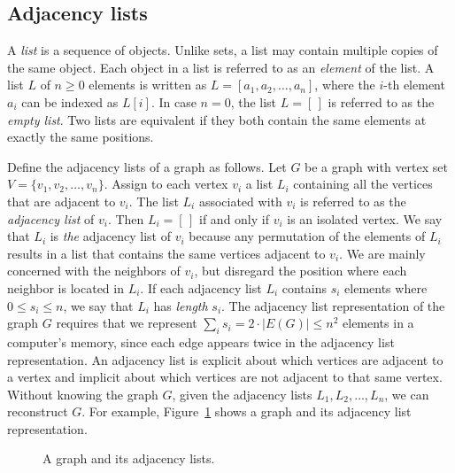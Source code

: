 
\subsection{Adjacency lists}
\label{sec:graph_algorithms:adjacency_lists}

A \emph{list} is a sequence of objects. Unlike
sets, a list may contain multiple copies of the same
object. Each object in a list is referred to as an
\emph{element} of the list. A list $L$ of
$n \geq 0$ elements is written as $L = [a_1, a_2, \dots, a_n]$, where
the $i$-th element $a_i$ can be indexed as $L[i]$. In case $n = 0$,
the list $L = [\,]$ is referred to as the
\emph{empty list}. Two lists are equivalent if they
both contain the same elements at exactly the same positions.

Define the adjacency lists of a graph as
follows. Let $G$ be a graph with vertex set
$V = \{v_1, v_2, \dots, v_n\}$. Assign to each vertex $v_i$ a list
$L_i$ containing all the vertices that are adjacent to $v_i$. The list
$L_i$ associated with $v_i$ is referred to as the
\emph{adjacency list} of $v_i$. Then
$L_i = [\,]$ if and only if $v_i$ is an isolated
vertex. We say that $L_i$ is \emph{the}
adjacency list of $v_i$ because any permutation of the elements of
$L_i$ results in a list that contains the same vertices adjacent to
$v_i$. We are mainly concerned with the neighbors of $v_i$, but
disregard the position where each neighbor is located in $L_i$. If
each adjacency list $L_i$ contains $s_i$
elements where $0 \leq s_i \leq n$, we say that $L_i$ has
\emph{length} $s_i$. The adjacency list
representation of the graph $G$ requires that we represent
$\sum_i s_i = 2 \cdot |E(G)| \leq n^2$ elements in a computer's
memory, since each edge appears twice in the adjacency list
representation. An adjacency list is explicit
about which vertices are adjacent to a vertex and implicit about
which vertices are not adjacent to that same vertex. Without knowing
the graph $G$, given the adjacency lists $L_1, L_2, \dots, L_n$, we
can reconstruct $G$. For example,
Figure~\ref{fig:graph_algorithms:graph_adjacency_lists} shows a graph
and its adjacency list representation.

\begin{figure}[!htbp]
\centering
{}

\caption{A graph and its adjacency lists.}
\label{fig:graph_algorithms:graph_adjacency_lists}
\end{figure}

